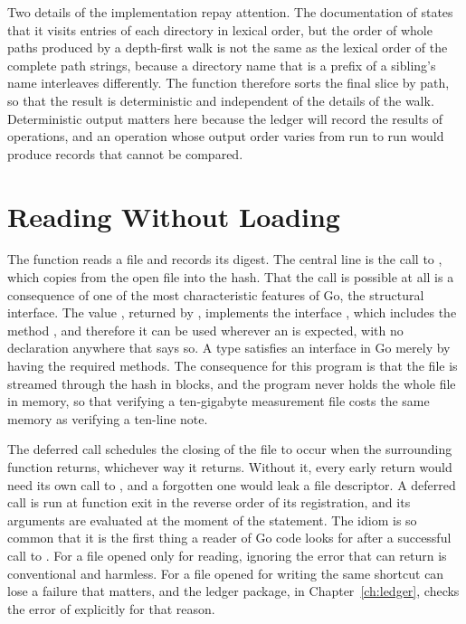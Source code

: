 Two details of the implementation repay attention. The documentation of  states that it visits entries of each directory in lexical order, but the order of whole paths produced by a depth-first walk is not the same as the lexical order of the complete path strings, because a directory name that is a prefix of a sibling's name interleaves differently. The function therefore sorts the final slice by path, so that the result is deterministic and independent of the details of the walk. Deterministic output matters here because the ledger will record the results of operations, and an operation whose output order varies from run to run would produce records that cannot be compared.

\section{Reading Without Loading}

The function  reads a file and records its digest. The central line is the call to , which copies from the open file into the hash. That the call is possible at all is a consequence of one of the most characteristic features of Go, the structural interface. The value , returned by , implements the interface , which includes the method , and therefore it can be used wherever an  is expected, with no declaration anywhere that says so. A type satisfies an interface in Go merely by having the required methods. The consequence for this program is that the file is streamed through the hash in blocks, and the program never holds the whole file in memory, so that verifying a ten-gigabyte measurement file costs the same memory as verifying a ten-line note.

The deferred call  schedules the closing of the file to occur when the surrounding function returns, whichever way it returns. Without it, every early return would need its own call to , and a forgotten one would leak a file descriptor. A deferred call is run at function exit in the reverse order of its registration, and its arguments are evaluated at the moment of the  statement. The idiom is so common that it is the first thing a reader of Go code looks for after a successful call to . For a file opened only for reading, ignoring the error that  can return is conventional and harmless. For a file opened for writing the same shortcut can lose a failure that matters, and the ledger package, in Chapter~\ref{ch:ledger}, checks the error of  explicitly for that reason.

